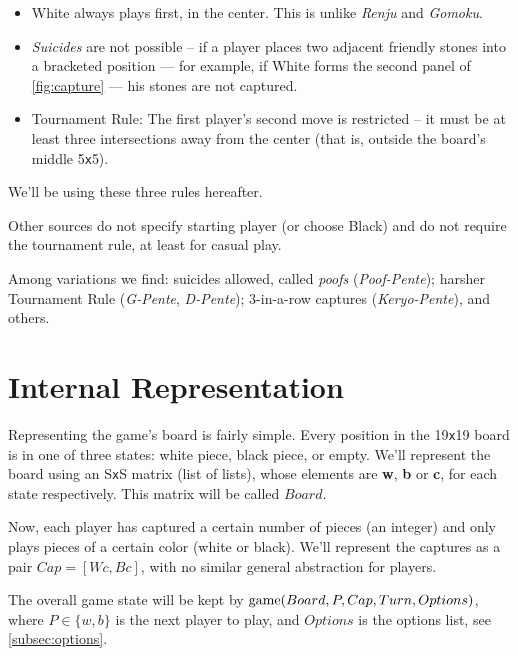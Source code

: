 \documentclass[12pt,a4paper,notitlepage]{article}
\newcommand*{\boardsize}[1]{#1\texttt{x}#1}
\begin{document}
\begin{itemize}
	\item White always plays first, in the center.\supercite{pente-renjunu, pente-wikipedia} This is unlike \textit{Renju} and \textit{Gomoku}.
	\item \textsl{Suicides} are not possible -- if a player places two adjacent friendly stones into a bracketed position --- for example, if White forms the second panel of \autoref{fig:capture} --- his stones are not captured.\supercite{pente-renjunu,pente-org,pente-wikipedia,pente-winning-moves}
	\item Tournament Rule: The first player's second move is restricted -- it must be at least three intersections away from the center (that is, outside the board's middle \boardsize{5}).\supercite{pente-net,pente-org,pente-wikipedia,pente-winning-moves}
\end{itemize}

We'll be using these three rules hereafter.

Other sources do not specify starting player (or choose Black) and do not require the tournament rule, at least for casual play. 

Among variations we find: suicides allowed, called \textit{poofs} (\textit{Poof-Pente}); harsher Tournament Rule (\textit{G-Pente}, \textit{D-Pente}); 3-in-a-row captures (\textit{Keryo-Pente}), and others.\supercite{pente-org,pente-net}

\section{Internal Representation}
\label{sec:internal}

Representing the game's board is fairly simple. Every position in the \boardsize{19} board is in one of three states: white piece, black piece, or empty. We'll represent the board using an \boardsize{S} matrix (list of lists), whose elements are \textbf{w}, \textbf{b} or \textbf{c}, for each state respectively. This matrix will be called $Board$.

Now, each player has captured a certain number of pieces (an integer) and only plays pieces of a certain color (white or black). We'll represent the captures as a pair $Cap=[Wc,Bc]$, with no similar general abstraction for players.

The overall game state will be kept by $\textup{game}(Board, P, Cap, Turn, Options)$, where $P\in\{w,b\}$ is the next player to play, and $Options$ is the options list, see \autoref{subsec:options}.
\end{document}
